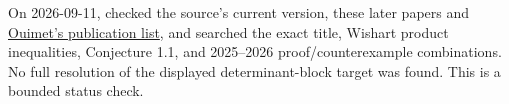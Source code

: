 \documentclass[11pt,a4paper]{article}
\begin{document}
On 2026-09-11, checked the source's current version, these later papers
and \href{https://sites.google.com/site/fouimet26/research}{Ouimet's
publication list}, and searched the exact title, Wishart product
inequalities, Conjecture 1.1, and 2025--2026 proof/counterexample
combinations. No full resolution of the displayed determinant-block
target was found. This is a bounded status check.
\end{document}
